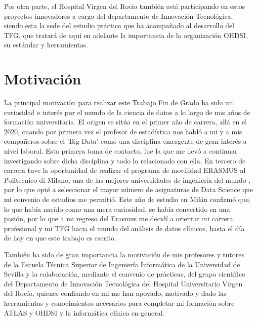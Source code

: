 Por otra parte, el Hospital Virgen del Rocio también está participando en estos proyectos innovadores a cargo del departamento de Innovación Tecnológica, siendo esta la sede del estudio práctico que ha acompañado al desarrollo del TFG, que tratará de aquí en adelante la importancia de la organización OHDSI, su estándar y herramientas.


\section{Motivación} \label{sec:01Motivacion}


La principal motivación para realizar este Trabajo Fin de Grado ha sido mi curiosidad e interés por el mundo de la ciencia de datos a lo largo de mis años de formación universitaria. El origen se sitúa en el primer año de carrera, allá en el 2020, cuando por primera vez el profesor de estadística nos habló a mi y a mis compañeros sobre el 'Big Data' como una disciplina emergente de gran interés a nivel laboral. Esta primera toma de contacto, fue la que me llevó a continuar investigando sobre dicha disciplina y todo lo relacionado con ella. En tercero de carrera tuve la oportunidad de realizar el programa de movilidad ERASMUS al Politecnico di Milano, una de las mejores universidades de ingeniería del mundo \cite{QSPolimi}, por lo que opté a seleccionar el mayor número de asignaturas de Data Science que mi convenio de estudios me permitió. Este año de estudio en Milán confirmó que, lo que había nacido como una mera curiosidad, se había convertido en una pasión, por lo que a mi regreso del Erasmus me decidí a orientar mi carrera profesional y mi TFG hacia el mundo del análisis de datos clínicos, hasta el día de hoy en que este trabajo es escrito.

También ha sido de gran importancia la motivación de mis profesores y tutores de la Escuela Técnica Superior de Ingeniería Informática de la Universidad de Sevilla y la colaboración, mediante el convenio de prácticas, del grupo científico del Departamento de Innovación Tecnológica del Hospital Universitario Virgen del Rocío, quienes confiando en mi me han apoyado, motivado y dado las herramientas y conocimientos necesarios para completar mi formación sobre ATLAS y OHDSI y la informática clínica en general.
